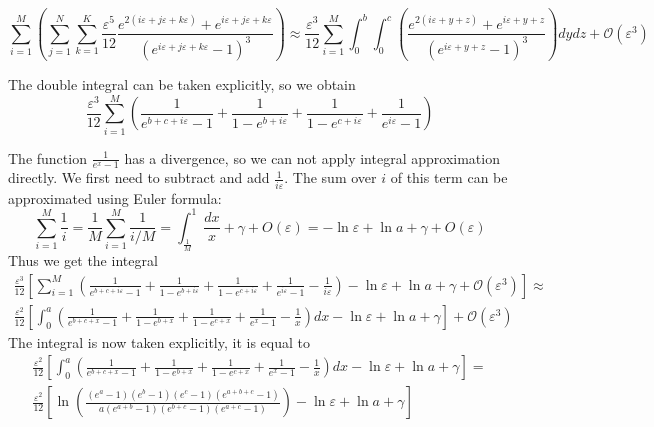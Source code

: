 \documentclass{article}
\begin{document}
\begin{equation}
  \label{eq:9}
\sum_{i=1}^{M}\left(\sum_{j=1}^{N}\sum_{k=1}^{K}\frac{\varepsilon^{5}}{12}
      \frac{e^{2(i\varepsilon+j\varepsilon+k\varepsilon)}+e^{i\varepsilon+j\varepsilon+k\varepsilon}}{\left(e^{i\varepsilon+j\varepsilon+k\varepsilon}-1\right)^{3}}  \right)\approx
    \frac{\varepsilon^{3}}{12}\sum_{i=1}^{M} \int_{0}^{b}\int_{0}^{c}
      \left(\frac{e^{2(i\varepsilon+y+z)}+e^{i\varepsilon+y+z}}{\left(e^{i\varepsilon+y+z}-1\right)^{3}}\right) dy dz+\mathcal{O}(\varepsilon^{3})
\end{equation}

The double integral can be taken explicitly, so we obtain
\begin{equation}
  \label{eq:11}
  \frac{\varepsilon^{3}}{12}\sum_{i=1}^{M}\left(     \frac{1}{e^{b+c+i\varepsilon}-1}+
  \frac{1}{1-e^{b+i\varepsilon}}+\frac{1}{1-e^{c+i\varepsilon}}+\frac{1}{e^{i\varepsilon}-1}\right)
\end{equation}

The function $\frac{1}{e^{x}-1}$ has a divergence, so we can not apply integral approximation directly. We first need to 
subtract and add $\frac{1}{i\varepsilon}$. The sum over $i$ of this term can be approximated using Euler formula:
  \begin{equation}
    \label{eq:24}
    \sum_{i=1}^{M}\frac{1}{i}=\frac{1}{M}\sum_{i=1}^{M}\frac{1}{i/M}=\int_{\frac{1}{M}}^{1}\frac{dx}{x}+\gamma+O(\varepsilon)=-\ln\varepsilon+\ln a+\gamma+O(\varepsilon)
  \end{equation}
Thus we get the integral
\begin{multline}
  \label{eq:13}
    \frac{\varepsilon^{3}}{12}\left[\sum_{i=1}^{M}\left(     \frac{1}{e^{b+c+i\varepsilon}-1}+
      \frac{1}{1-e^{b+i\varepsilon}}+\frac{1}{1-e^{c+i\varepsilon}}+\frac{1}{e^{i\varepsilon}-1}-\frac{1}{i\varepsilon}\right)-\ln\varepsilon+\ln a+\gamma+\mathcal{O}(\varepsilon^{3})\right]\approx\\
   \frac{\varepsilon^{2}}{12}\left[\int_{0}^{a}\left(     \frac{1}{e^{b+c+x}-1}+
      \frac{1}{1-e^{b+x}}+\frac{1}{1-e^{c+x}}+\frac{1}{e^{x}-1}-\frac{1}{x}\right)dx-\ln\varepsilon+\ln a+\gamma\right]+\mathcal{O}(\varepsilon^{3})    
\end{multline}
The integral is now taken explicitly, it is equal to
\begin{multline}
  \label{eq:22}
     \frac{\varepsilon^{2}}{12}\left[\int_{0}^{a}\left(     \frac{1}{e^{b+c+x}-1}+
         \frac{1}{1-e^{b+x}}+\frac{1}{1-e^{c+x}}+\frac{1}{e^{x}-1}-\frac{1}{x}\right)dx-\ln\varepsilon+\ln a+\gamma\right]=\\
     \frac{\varepsilon^{2}}{12}\left[\ln \left(\frac{(e^{a}-1)(e^{b}-1)(e^{c}-1)(e^{a+b+c}-1)}{a (e^{a+b}-1)(e^{b+c}-1)(e^{a+c}-1)}\right)-\ln\varepsilon+\ln a+\gamma\right]
\end{multline}
\end{document}
